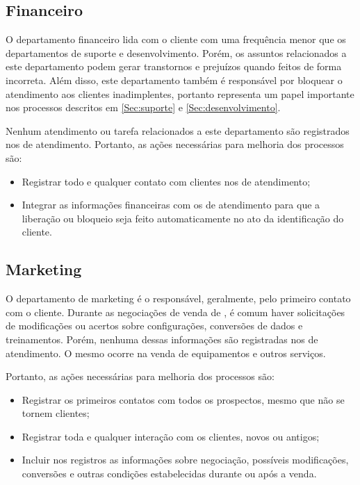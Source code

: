\subsection{Financeiro}

O departamento financeiro lida com o cliente com uma frequência menor que os departamentos de suporte e desenvolvimento. Porém, os assuntos relacionados a este departamento podem gerar transtornos e prejuízos quando feitos de forma incorreta. Além disso, este departamento também é responsável por bloquear o atendimento aos clientes inadimplentes, portanto representa um papel importante nos processos descritos em \ref{Sec:suporte} e \ref{Sec:desenvolvimento}.

Nenhum atendimento ou tarefa relacionados a este departamento são registrados nos \sws de atendimento. Portanto, as ações necessárias para melhoria dos processos são:

\begin{itemize}

\item Registrar todo e qualquer contato com clientes nos \sws de atendimento;

\item Integrar as informações financeiras com os \sws de atendimento para que a liberação ou bloqueio seja feito automaticamente no ato da identificação do cliente.

\end{itemize}

\subsection{Marketing}

O departamento de marketing é o responsável, geralmente, pelo primeiro contato com o cliente. Durante as negociações de venda de \sw, é comum haver solicitações de modificações ou acertos sobre configurações, conversões de dados e treinamentos. Porém, nenhuma dessas informações são registradas nos \sws de atendimento. O mesmo ocorre na venda de equipamentos e outros serviços.

Portanto, as ações necessárias para melhoria dos processos são:

\begin{itemize}

\item Registrar os primeiros contatos com todos os prospectos, mesmo que não se tornem clientes;

\item Registrar toda e qualquer interação com os clientes, novos ou antigos;

\item Incluir nos registros as informações sobre negociação, possíveis modificações, conversões e outras condições estabelecidas durante ou após a venda.

\end{itemize}

